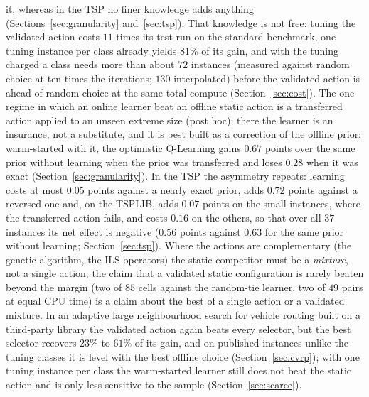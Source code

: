 it, whereas in the TSP no finer knowledge adds anything (Sections~\ref{sec:granularity} and~\ref{sec:tsp}). That knowledge is not free: tuning the validated action costs $11$ times its test run on the standard benchmark, one tuning instance per class already yields $81\%$ of its gain, and with the tuning charged a class needs more than about $72$ instances (measured against random choice at ten times the iterations; $130$ interpolated) before the validated action is ahead of random choice at the same total compute (Section~\ref{sec:cost}). The one regime in which an online learner beat an offline static action is a transferred action applied to an unseen extreme size (post hoc); there the learner is an insurance, not a substitute, and it is best built as a correction of the offline prior: warm-started with it, the optimistic Q-Learning gains $0.67$ points over the same prior without learning when the prior was transferred and loses $0.28$ when it was exact (Section~\ref{sec:granularity}). In the TSP the asymmetry repeats: learning costs at most $0.05$ points against a nearly exact prior, adds $0.72$ points against a reversed one and, on the TSPLIB, adds $0.07$ points on the small instances, where the transferred action fails, and costs $0.16$ on the others, so that over all $37$ instances its net effect is negative ($0.56$ points against $0.63$ for the same prior without learning; Section~\ref{sec:tsp}). Where the actions are complementary (the genetic algorithm, the ILS operators) the static competitor must be a \emph{mixture}, not a single action; the claim that a validated static configuration is rarely beaten beyond the margin (two of $85$ cells against the random-tie learner, two of $49$ pairs at equal CPU time) is a claim about the best of a single action or a validated mixture. In an adaptive large neighbourhood search for vehicle routing built on a third-party library the validated action again beats every selector, but the best selector recovers $23\%$ to $61\%$ of its gain, and on published instances unlike the tuning classes it is level with the best offline choice (Section~\ref{sec:cvrp}); with one tuning instance per class the warm-started learner still does not beat the static action and is only less sensitive to the sample (Section~\ref{sec:scarce}).

